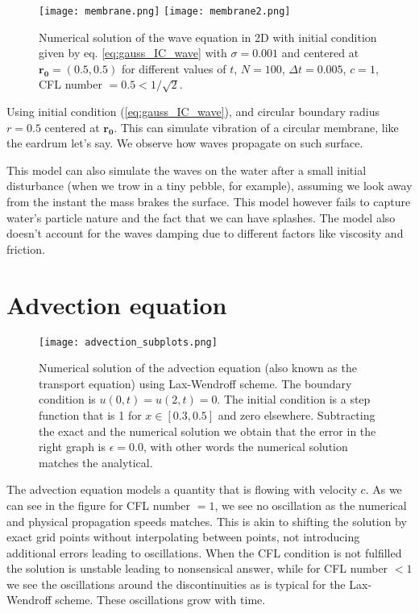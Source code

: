 \documentclass[5p,sort&compress]{elsarticle}
\numberwithin{equation}{subsection}
\begin{document}
\begin{figure}[H]
\centering
\texttt{[image: membrane.png]} %
\texttt{[image: membrane2.png]} %
\caption{Numerical solution of the wave equation in 2D with initial condition given by eq. \ref{eq:gauss_IC_wave} with $\sigma = 0.001$ and centered at $\mathbf{r_0} = (0.5,0.5)$ for different values of $t$, $N = 100$, $\Delta t = 0.005$, $c = 1$, CFL number $ = 0.5 < 1/\sqrt{2}$.}
\label{fig:membrane}
\end{figure}

Using initial condition (\ref{eq:gauss_IC_wave}), and circular boundary radius $r=0.5$ centered at $\mathbf{r_0}$. This can simulate vibration of a circular membrane, like the eardrum let's say. We observe how waves propagate on such surface.

This model can also simulate the waves on the water after a small initial disturbance (when we trow in a  tiny pebble, for example), assuming we look away from the instant the mass brakes the surface. This model however fails to capture water's particle nature and the fact that we can have splashes. The model also doesn't account for the waves damping due to different factors like viscosity and friction.
\section{Advection equation}
\begin{figure}[H]
\centering
\texttt{[image: advection\_subplots.png]} %
\caption{Numerical solution of the advection equation (also known as the transport equation) using Lax-Wendroff scheme. The boundary condition is $u(0,t) = u(2,t) = 0$. The initial condition is a step function that is 1 for $x\in[0.3,0.5]$ and zero elsewhere. Subtracting the exact and the numerical solution we obtain that the error in the right graph is $\epsilon = 0.0$, with other words the numerical solution matches the analytical.}
\label{fig:advection_subplots}
\end{figure}
The advection equation models a quantity that is flowing with velocity $c$. As we can see in the figure for CFL number $= 1$, we see no oscillation as the numerical and physical propagation speeds matches. This is akin to shifting the solution by exact grid points without interpolating between points, not introducing additional errors leading to oscillations. When the CFL condition is not fulfilled the solution is unstable leading to nonsensical answer, while for CFL number $< 1$ we see the oscillations around the discontinuities as is typical for the Lax-Wendroff scheme. These oscillations grow with time. 
 
\end{document}
